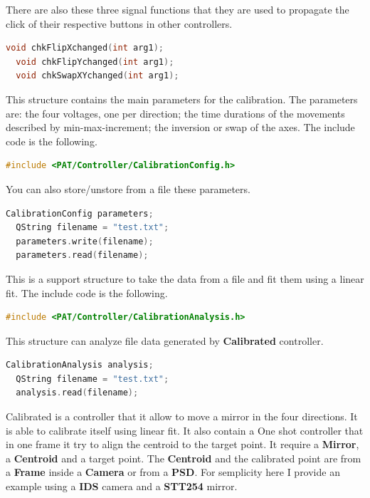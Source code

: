 There are also these three signal functions that they are used to
propagate the click of their respective buttons in other controllers.

\begin{lstlisting}[language=c++, gobble=2]
  void chkFlipXchanged(int arg1);
  void chkFlipYchanged(int arg1);
  void chkSwapXYchanged(int arg1);
\end{lstlisting}



This structure contains the main parameters for the calibration. The
parameters are: the four voltages, one per direction; the time durations
of the movements described by min-max-increment; the inversion or swap
of the axes. The include code is the following.

\begin{lstlisting}[language=c++, gobble=2]
  #include <PAT/Controller/CalibrationConfig.h>
\end{lstlisting}


You can also store/unstore from a file these parameters.

\begin{lstlisting}[language=c++, gobble=2]
  CalibrationConfig parameters;
  QString filename = "test.txt";
  parameters.write(filename);
  parameters.read(filename);
\end{lstlisting}



This is a support structure to take the data from a file and fit them
using a linear fit. The include code is the following.

\begin{lstlisting}[language=c++, gobble=2]
  #include <PAT/Controller/CalibrationAnalysis.h>
\end{lstlisting}

This structure can analyze file data generated by \textbf{Calibrated}
controller.

\begin{lstlisting}[language=c++, gobble=2]
  CalibrationAnalysis analysis;
  QString filename = "test.txt";
  analysis.read(filename);
\end{lstlisting}


Calibrated is a controller that it allow to move a mirror in the four
directions. It is able to calibrate itself using linear fit. It also
contain a One shot controller that in one frame it try to align the
centroid to the target point. It require a \textbf{Mirror}, a
\textbf{Centroid} and a target point. The \textbf{Centroid} and the
calibrated point are from a \textbf{Frame} inside a \textbf{Camera} or
from a \textbf{PSD}. For semplicity here I provide an example using a
\textbf{IDS} camera and a \textbf{STT254} mirror.

